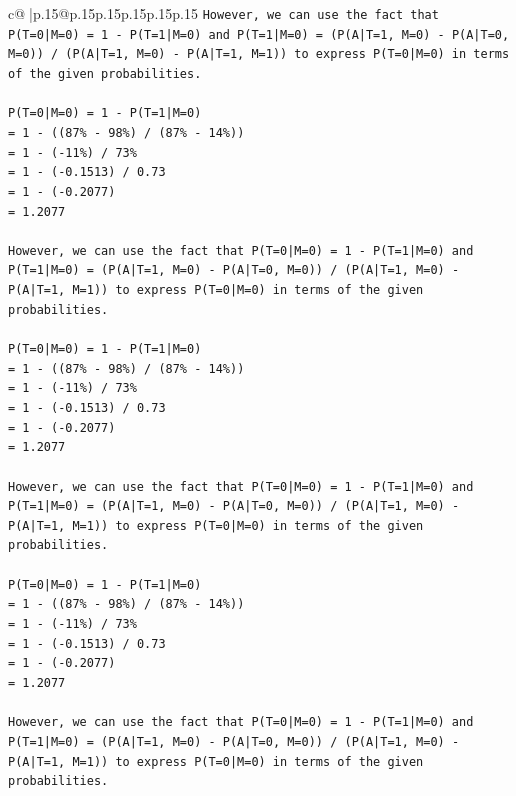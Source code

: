 \documentclass{article}
\begin{document}
{\begin{supertabular}{c@{$\;$}|p{.15\linewidth}@{}p{.15\linewidth}p{.15\linewidth}p{.15\linewidth}p{.15\linewidth}p{.15\linewidth}}
{{{\texttt{However, we can use the fact that P(T=0|M=0) = 1 {-} P(T=1|M=0) and P(T=1|M=0) = (P(A|T=1, M=0) {-} P(A|T=0, M=0)) / (P(A|T=1, M=0) {-} P(A|T=1, M=1)) to express P(T=0|M=0) in terms of the given probabilities.} \\
\\ 
\texttt{P(T=0|M=0) = 1 {-} P(T=1|M=0)} \\
\texttt{= 1 {-} ((87\% {-} 98\%) / (87\% {-} 14\%))} \\
\texttt{= 1 {-} ({-}11\%) / 73\%} \\
\texttt{= 1 {-} ({-}0.1513) / 0.73} \\
\texttt{= 1 {-} ({-}0.2077)} \\
\texttt{= 1.2077} \\
\\ 
\texttt{However, we can use the fact that P(T=0|M=0) = 1 {-} P(T=1|M=0) and P(T=1|M=0) = (P(A|T=1, M=0) {-} P(A|T=0, M=0)) / (P(A|T=1, M=0) {-} P(A|T=1, M=1)) to express P(T=0|M=0) in terms of the given probabilities.} \\
\\ 
\texttt{P(T=0|M=0) = 1 {-} P(T=1|M=0)} \\
\texttt{= 1 {-} ((87\% {-} 98\%) / (87\% {-} 14\%))} \\
\texttt{= 1 {-} ({-}11\%) / 73\%} \\
\texttt{= 1 {-} ({-}0.1513) / 0.73} \\
\texttt{= 1 {-} ({-}0.2077)} \\
\texttt{= 1.2077} \\
\\ 
\texttt{However, we can use the fact that P(T=0|M=0) = 1 {-} P(T=1|M=0) and P(T=1|M=0) = (P(A|T=1, M=0) {-} P(A|T=0, M=0)) / (P(A|T=1, M=0) {-} P(A|T=1, M=1)) to express P(T=0|M=0) in terms of the given probabilities.} \\
\\ 
\texttt{P(T=0|M=0) = 1 {-} P(T=1|M=0)} \\
\texttt{= 1 {-} ((87\% {-} 98\%) / (87\% {-} 14\%))} \\
\texttt{= 1 {-} ({-}11\%) / 73\%} \\
\texttt{= 1 {-} ({-}0.1513) / 0.73} \\
\texttt{= 1 {-} ({-}0.2077)} \\
\texttt{= 1.2077} \\
\\ 
\texttt{However, we can use the fact that P(T=0|M=0) = 1 {-} P(T=1|M=0) and P(T=1|M=0) = (P(A|T=1, M=0) {-} P(A|T=0, M=0)) / (P(A|T=1, M=0) {-} P(A|T=1, M=1)) to express P(T=0|M=0) in terms of the given probabilities.} \\
}}}
\end{supertabular}}
\end{document}
